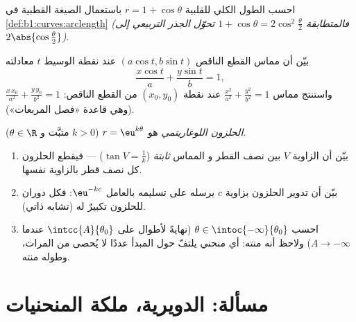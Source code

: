 \begin{exercise}[$\star\star$]\label{exo:b1:curves:10}
احسب الطول الكلي للقلبية $r = 1 + \cos\theta$
باستعمال الصيغة القطبية في \cref{def:b1:curves:arclength}
\emph{(فالمتطابقة $1 + \cos\theta = 2\cos^2\frac\theta2$ تحوّل
الجذر التربيعي إلى $2\abs{\cos\frac\theta2}$)}.
\end{exercise}

\begin{exercise}[$\star\star$]\label{exo:b1:curves:11}
بيّن أن مماس القطع الناقص $(a\cos t, b\sin t)$ عند
نقطة الوسيط $t$ معادلته
\[
\frac{x\cos t}{a} + \frac{y\sin t}{b} = 1 ,
\]
واستنتج مماس $\frac{x^2}{a^2} + \frac{y^2}{b^2} = 1$
عند نقطة $(x_0, y_0)$ من القطع الناقص: $\frac{x\,x_0}{a^2} +
\frac{y\,y_0}{b^2} = 1$ (وهي قاعدة «فصل المربعات»).
\end{exercise}

\begin{exercise}[$\star\star\star$]\label{exo:b1:curves:12}
\emph{الحلزون اللوغاريتمي} هو  $r =
\eu^{k\theta}$ ($k > 0$ مثبَّت و $\theta \in \R$).
\begin{enumerate}
  \item بيّن أن الزاوية $V$ بين نصف القطر و
        المماس \emph{ثابتة} ($\tan V = \frac1k$) --- فيقطع
        الحلزون كل نصف قطر بالزاوية نفسها.
  \item بيّن أن تدوير الحلزون بزاوية $c$ يرسله
        على تسليمه بالعامل $\eu^{-kc}$: فكل
        دوران للحلزون تكبيرٌ له
        (تشابه ذاتي).
  \item احسب  $\theta \in
        \intoc{-\infty}{\theta_0}$ (نهايةً لأطوال على
        $\intcc{A}{\theta_0}$ عندما $A \to -\infty$) ولاحظ
        أنه منته: أي منحني يلتفّ حول المبدأ عددًا لا يُحصى
        من المرات، وطوله منته.
\end{enumerate}
\end{exercise}

\section{مسألة: الدويرية، ملكة المنحنيات}

